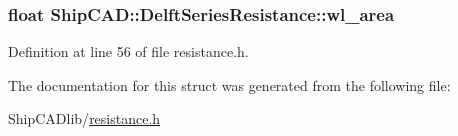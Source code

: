 \subsubsection[{\texorpdfstring{wl\+\_\+area}{wl_area}}]{\setlength{\rightskip}{0pt plus 5cm}float Ship\+C\+A\+D\+::\+Delft\+Series\+Resistance\+::wl\+\_\+area}\hypertarget{structShipCAD_1_1DelftSeriesResistance_af51e72b70af1ce87cf7ac641df93c541}{}\label{structShipCAD_1_1DelftSeriesResistance_af51e72b70af1ce87cf7ac641df93c541}


Definition at line 56 of file resistance.\+h.



The documentation for this struct was generated from the following file\+:\begin{DoxyCompactItemize}
\item 
Ship\+C\+A\+Dlib/\hyperlink{resistance_8h}{resistance.\+h}\end{DoxyCompactItemize}
